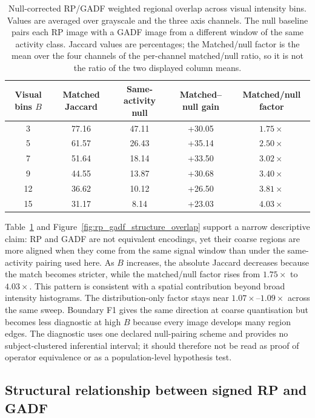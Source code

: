 \documentclass[10pt,a4paper,parskip=half-]{scrartcl}
\begin{document}
\begin{table}[H]
\centering
\caption{Null-corrected RP/GADF weighted regional overlap across visual intensity bins. Values are averaged over grayscale and the three axis channels. The null baseline pairs each RP image with a GADF image from a different window of the same activity class. Jaccard values are percentages; the Matched/null factor is the mean over the four channels of the per-channel matched/null ratio, so it is not the ratio of the two displayed column means.}
\label{tab:rp_gadf_region_overlap}
\setlength{\tabcolsep}{6pt}
\footnotesize
\begin{tabular}{@{}ccccc@{}}
\toprule
Visual bins \(B\) & Matched Jaccard & Same-activity null & Matched--null gain & Matched/null factor \\
\midrule
3  & 77.16 & 47.11 & +30.05 & \(1.75\times\) \\
5  & 61.57 & 26.43 & +35.14 & \(2.50\times\) \\
7  & 51.64 & 18.14 & +33.50 & \(3.02\times\) \\
9  & 44.55 & 13.87 & +30.68 & \(3.40\times\) \\
12 & 36.62 & 10.12 & +26.50 & \(3.81\times\) \\
15 & 31.17 & 8.14  & +23.03 & \(4.03\times\) \\
\bottomrule
\end{tabular}
\end{table}
\FloatBarrier

Table~\ref{tab:rp_gadf_region_overlap} and Figure~\ref{fig:rp_gadf_structure_overlap} support a narrow descriptive claim: RP and GADF are not equivalent encodings, yet their coarse regions are more aligned when they come from the same signal window than under the same-activity pairing used here. As \(B\) increases, the absolute Jaccard decreases because the match becomes stricter, while the matched/null factor rises from \(1.75\times\) to \(4.03\times\). This pattern is consistent with a spatial contribution beyond broad intensity histograms. The distribution-only factor stays near \(1.07\times\)--\(1.09\times\) across the same sweep. Boundary F1 gives the same direction at coarse quantisation but becomes less diagnostic at high \(B\) because every image develops many region edges. The diagnostic uses one declared null-pairing scheme and provides no subject-clustered inferential interval; it should therefore not be read as proof of operator equivalence or as a population-level hypothesis test.
\subsection{Structural relationship between signed RP and GADF}
\label{sec:supp_structural}
\end{document}
